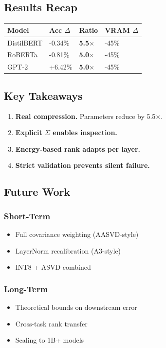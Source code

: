 \subsection{Results Recap}

\begin{table}[H]
\centering
\small
\begin{tabular}{llll}
\toprule
\textbf{Model} & \textbf{Acc $\Delta$} & \textbf{Ratio} & \textbf{VRAM $\Delta$} \\
\midrule
DistilBERT & -0.34\% & \textbf{5.5$\times$} & -45\% \\
RoBERTa & -0.81\% & \textbf{5.0$\times$} & -45\% \\
GPT-2 & +6.42\% & \textbf{5.0$\times$} & -45\% \\
\bottomrule
\end{tabular}
\end{table}

\subsection{Key Takeaways}

\begin{enumerate}
\item \textbf{Real compression.} Parameters reduce by 5.5$\times$.
\item \textbf{Explicit $\Sigma$ enables inspection.}
\item \textbf{Energy-based rank adapts per layer.}
\item \textbf{Strict validation prevents silent failure.}

\end{enumerate}
\subsection{Future Work}

\subsubsection{Short-Term}
\begin{itemize}
\item Full covariance weighting (AASVD-style)
\item LayerNorm recalibration (A3-style)
\item INT8 + ASVD combined

\end{itemize}
\subsubsection{Long-Term}
\begin{itemize}
\item Theoretical bounds on downstream error
\item Cross-task rank transfer
\item Scaling to 1B+ models

\end{itemize}
